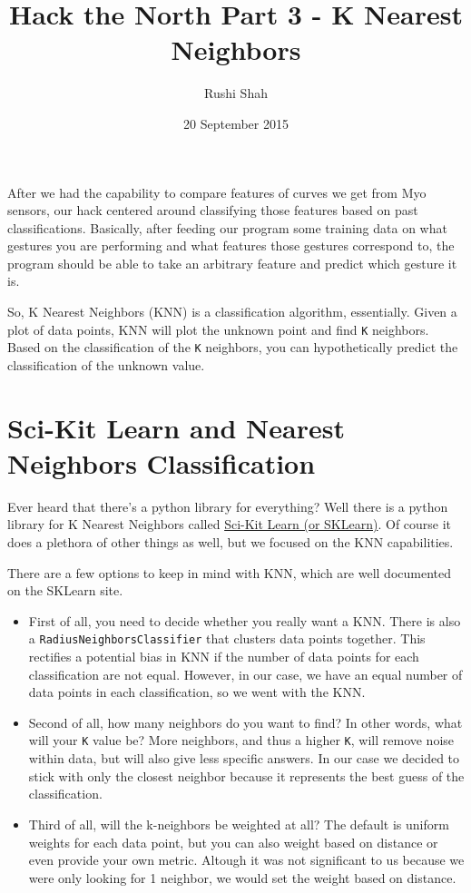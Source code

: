 \documentclass[12pt]{article}
\title{Hack the North Part 3 - K Nearest Neighbors}
\author{Rushi Shah}
\date{20 September 2015}
\begin{document}
  \maketitle

After we had the capability to compare features of curves we get from
Myo sensors, our hack centered around classifying those features based
on past classifications. Basically, after feeding our program some
training data on what gestures you are performing and what features
those gestures correspond to, the program should be able to take an
arbitrary feature and predict which gesture it is.

So, K Nearest Neighbors (KNN) is a classification algorithm,
essentially. Given a plot of data points, KNN will plot the unknown
point and find \texttt{K} neighbors. Based on the classification of the
\texttt{K} neighbors, you can hypothetically predict the classification
of the unknown value.

\section{Sci-Kit Learn and Nearest Neighbors
Classification}\label{sci-kit-learn-and-nearest-neighbors-classification}

Ever heard that there's a python library for everything? Well there is a
python library for K Nearest Neighbors called
\href{http://scikit-learn.org/stable/modules/neighbors.html\#nearest-neighbors-classification}{Sci-Kit
Learn (or SKLearn)}. Of course it does a plethora of other things as
well, but we focused on the KNN capabilities.

There are a few options to keep in mind with KNN, which are well
documented on the SKLearn site.

\begin{itemize}
\item
  First of all, you need to decide whether you really want a KNN. There
  is also a \texttt{RadiusNeighborsClassifier} that clusters data points
  together. This rectifies a potential bias in KNN if the number of data
  points for each classification are not equal. However, in our case, we
  have an equal number of data points in each classification, so we went
  with the KNN.\\
\item
  Second of all, how many neighbors do you want to find? In other words,
  what will your \texttt{K} value be? More neighbors, and thus a higher
  \texttt{K}, will remove noise within data, but will also give less
  specific answers. In our case we decided to stick with only the
  closest neighbor because it represents the best guess of the
  classification.
\item
  Third of all, will the k-neighbors be weighted at all? The default is
  uniform weights for each data point, but you can also weight based on
  distance or even provide your own metric. Altough it was not
  significant to us because we were only looking for 1 neighbor, we
  would set the weight based on distance.
\end{itemize}
\end{document}
